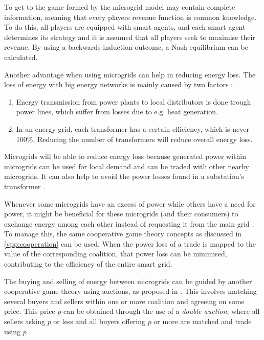 To get to the game formed by the microgrid model may contain complete information, meaning that every players revenue function is common knowledge. 
To do this, all players are equipped with smart agents, and each smart agent determines its strategy and it is assumed that all players seek to maximise their revenue. By using a backwards-induction-outcome, a Nash equilibrium can be calculated.\cite{MicrogridModellingPetrosAristidou}


Another advantage when using microgrids can help in reducing energy loss. The loss of energy with big energy networks is mainly caused by two factors \cite{EnergyLossURL}: 

\begin{enumerate}
\item Energy transmission from power plants to local distributors is done trough power lines, which suffer from losses due to e.g. heat generation\cite{LasseterPaigi2004}.
\item In an energy grid, each transformer has a certain efficiency, which is never 100\%. Reducing the number of transformers will reduce overall energy loss.
\end{enumerate}

Microgrids will be able to reduce energy loss because generated power within microgrids can be used for local demand and can be traded with other nearby microgrids. It can also help to avoid the power losses found in a substation's transformer \cite{keypaper}.

Whenever some microgrids have an excess of power while others have a need for power, it might be beneficial for these microgrids (and their consumers) to exchange energy among each other instead of requesting it from the main grid \cite{SaadHanPoorEtAl2011}. To manage this, the same cooperative game theory concepts as discussed in \ref{vpp:cooperation}  can be used. When the power loss of a trade is mapped to the value of the corresponding coalition, that power loss can be minimised, contributing to the efficiency of the entire smart grid. 

The buying and selling of energy between microgrids can be guided by another cooperative game theory using auctions, as proposed in \cite{SaadHanPoorEtAl2011}. This involves matching several buyers and sellers within one or more coalition and agreeing on some price. This price $p$ can be obtained through the use of a \emph{double auction}, where all sellers asking $p$ or less and all buyers offering $p$ or more are matched and trade using $p$ \cite{gjerstad1998price}.

